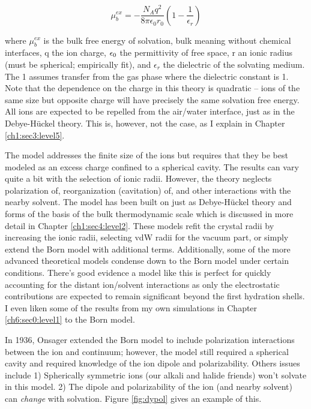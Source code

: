 \begin{intro}
    \begin{equation}
        \mu^{ex}_{b} = -\frac{N_{A}q^{2}}{8\pi\epsilon_{0}r_{0}}\left(1-\frac{1}{\epsilon_{r}}\right)
    \end{equation}

    \noindent where $\mu^{ex}_{b}$ is the bulk free energy of solvation, bulk meaning without chemical interfaces, q the ion charge, $\epsilon_{\mathrm{0}}$ the permittivity of free
    space, r an ionic radius (must be spherical; empirically fit), and $\epsilon_{r}$ the dielectric of the solvating medium. The 1 assumes transfer from the gas phase 
    where the dielectric constant is 1. Note that the dependence on the charge in this theory is quadratic -- ions of the same size but opposite charge will have precisely the same 
    solvation free energy. All ions are expected to be repelled from the air/water interface, just as in the Debye-H\"{u}ckel theory\cite{onsager1934surface}. This is, however,
    not the case, as I explain in Chapter \ref{ch1:sec3:level5}. 
    
    The model addresses the finite size of the ions but requires that they be best modeled as an excess charge confined to a spherical cavity. The results can vary quite a bit
    with the selection of ionic radii. However, the theory neglects polarization of, reorganization (cavitation) of, and other interactions with the nearby solvent. The model has 
    been built on just as Debye-H\"{u}ckel theory and forms of the basis of the bulk thermodynamic scale\cite{ashbaugh2008lps,marcus1985book,rashin1985reevaluation} which is 
    discussed in more detail in Chapter \ref{ch1:sec4:level2}. These models refit the crystal radii by increasing the ionic radii\cite{latimer1939freenergy}, selecting vdW radii
    for the vacuum part\cite{stokes1964van}, or simply extend the Born model with additional terms\cite{rashin1985reevaluation}. 
    Additionally, some of the more advanced theoretical models condense down to the Born model under certain conditions\cite{roux1990molecular}. There's good evidence a model 
    like this is perfect for quickly accounting for the distant ion/solvent interactions as only the electrostatic contributions are expected to remain significant beyond the first hydration 
    shells\cite{beck2011local,beck2011lmft,hummer1996,shi2013length}. I even liken some of the results from my own simulations in Chapter \ref{ch6:sec0:level1} to the Born model.
    
    In 1936, Onsager extended the Born model to include polarization interactions between the ion and continuum; however, the model still required a spherical cavity and 
    required knowledge of the ion dipole and polarizability. Others issues include 1) Spherically symmetric ions (our alkali and halide friends) won't solvate in this model. 
    2) The dipole and polarizability of the ion (and nearby solvent) can \emph{change} with 
    solvation\cite{masia2009polarize,masia2013polar,patel2010polarizability,ren2003amoebaion,amoeba,rogers2010ctpolar,silvestrelli1999water}. Figure \ref{fig:dypol} gives an 
    example of this.
    

\end{intro}
